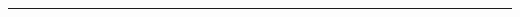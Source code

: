 \documentclass[3pt,landscape]{article}
\begin{document}
\begin{multicols}{3}


\rule{0.3\linewidth}{0.25pt}
\newpage
\scriptsize


\end{multicols}
\end{document}
